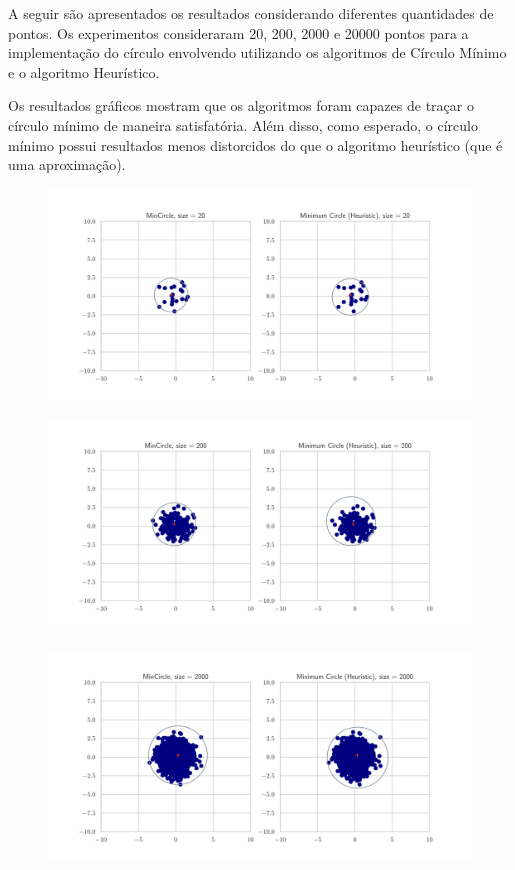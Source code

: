 \documentclass{article}
\begin{document}
A seguir são apresentados os resultados considerando diferentes quantidades de pontos. Os experimentos consideraram 20, 200, 2000 e 20000 pontos para a implementação do círculo envolvendo utilizando os algoritmos de Círculo Mínimo e o algoritmo Heurístico.

Os resultados gráficos mostram que os algoritmos foram capazes de traçar o círculo mínimo de maneira satisfatória. Além disso, como esperado, o círculo mínimo possui resultados menos distorcidos do que o algoritmo heurístico (que é uma aproximação).

\begin{figure}[H]
  \centering
  \includegraphics[scale=0.6]{figures/simulation/plot_min_circle_20_points.pdf}
\end{figure}

\begin{figure}[H]
  \centering
  \includegraphics[scale=0.6]{figures/simulation/plot_min_circle_200_points.pdf}
\end{figure}

\begin{figure}[H]
  \centering
  \includegraphics[scale=0.6]{figures/simulation/plot_min_circle_2000_points.pdf}
\end{figure}
\end{document}

